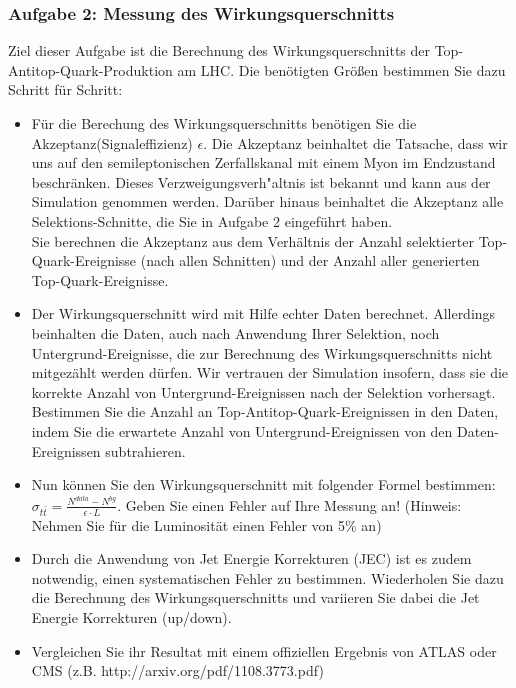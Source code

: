 \subsubsection{Aufgabe 2: Messung des Wirkungsquerschnitts}
Ziel dieser Aufgabe ist die Berechnung des Wirkungsquerschnitts der Top-Antitop-Quark-Produktion am LHC. Die ben\"otigten Gr\"o\ss{}en bestimmen Sie dazu Schritt f\"ur Schritt:
\begin{itemize}
	\item F\"ur die Berechung des Wirkungsquerschnitts ben\"otigen Sie die Akzeptanz(Signaleffizienz) $\epsilon$. Die Akzeptanz beinhaltet die Tatsache, dass wir uns auf den semileptonischen Zerfalls\-kanal mit einem Myon im Endzustand beschr\"anken. Dieses Verzweigungsverh"altnis ist bekannt und kann aus der Simulation genommen werden. Dar\"uber hinaus beinhaltet die Akzeptanz alle Selektions-Schnitte, die Sie in Aufgabe 2 eingef\"uhrt haben. \\Sie berechnen die Akzeptanz aus dem Verh\"altnis der Anzahl selektierter Top-Quark-Ereignisse (nach allen Schnitten) und der Anzahl aller generierten Top-Quark-Er\-eig\-nisse.
	\item Der Wirkungsquerschnitt wird mit Hilfe echter Daten berechnet. Allerdings beinhalten die Daten, auch nach Anwendung Ihrer Selektion, noch Untergrund-Ereignisse, die zur Berechnung des Wirkungsquerschnitts nicht mitgez\"ahlt werden d\"urfen. Wir vertrauen der Simulation insofern, dass sie die korrekte Anzahl von Untergrund-Ereignissen nach der Selektion vorhersagt. Bestimmen Sie die Anzahl an Top-Antitop-Quark-Ereignissen in den Daten, indem Sie die erwartete Anzahl von Untergrund-Ereignissen von den Daten-Ereignissen subtrahieren.
	\item Nun k\"onnen Sie den Wirkungsquerschnitt mit folgender Formel bestimmen: $\sigma_{t\bar{t}} = \frac{N^{data} - N^{bg}}{\epsilon \cdot L}$. Geben Sie einen Fehler auf Ihre Messung an! (Hinweis: Nehmen Sie f\"ur die Luminosit\"at einen Fehler von 5\% an)
        \item Durch die Anwendung von Jet Energie Korrekturen (JEC) ist es zudem notwendig, einen systematischen Fehler zu bestimmen. Wiederholen Sie dazu die Berechnung des Wirkungsquerschnitts und variieren Sie dabei die Jet Energie Korrekturen (up/down). 
	\item Vergleichen Sie ihr Resultat mit einem offiziellen Ergebnis von ATLAS oder CMS (z.B. http://arxiv.org/pdf/1108.3773.pdf)
\end{itemize}

